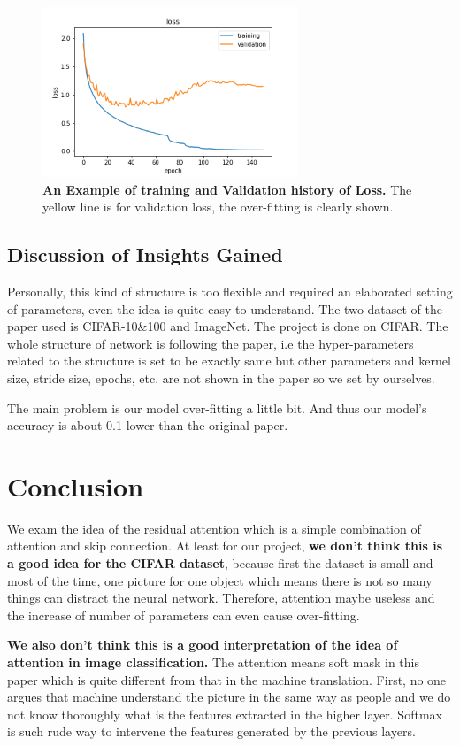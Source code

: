 \documentclass{article}
\newcommand{\mycaption}[2]{\caption[#1]{\textbf{#1.} #2}}
\begin{document}
\begin{multicols}{2}
\begin{figure}[H] 
\includegraphics[width=3in]{imgs/loss.png}  
\mycaption{An Example of training and Validation history of Loss}{The yellow line is for validation loss, the over-fitting is clearly shown.}  
\label{fig:loss}
\end{figure}

\subsection{Discussion of Insights Gained}
Personally, this kind of structure is too flexible and required an elaborated setting of parameters, even the idea is quite easy to understand. The two dataset of the paper used is CIFAR-10\&100 and ImageNet. The project is done on CIFAR. The whole structure of network is following the paper, i.e the hyper-parameters related to the structure is set to be exactly same but other parameters and kernel size, stride size, epochs, etc. are not shown in the paper so we set by ourselves. 

The main problem is our model over-fitting a little bit. And thus our model's accuracy is about 0.1 lower than the original paper. 





\section{Conclusion}
We exam the idea of the residual attention which is a simple combination of attention and skip connection. At least for our project, \textbf{we don't think this is a good idea for the CIFAR dataset}, because first the dataset is small and most of the time, one picture for one object which means there is not so many things can distract the neural network. Therefore, attention maybe useless and the increase of number of parameters can even cause over-fitting. 

\textbf{We also don't think this is a good interpretation of the idea of attention in image classification.} The attention means soft mask in this paper which is quite different from that in the machine translation. First, no one argues that machine understand the picture in the same way as people and we do not know thoroughly what is the features extracted in the higher layer. Softmax is such rude way to intervene the features generated by the previous layers.


\end{multicols}
\end{document}
